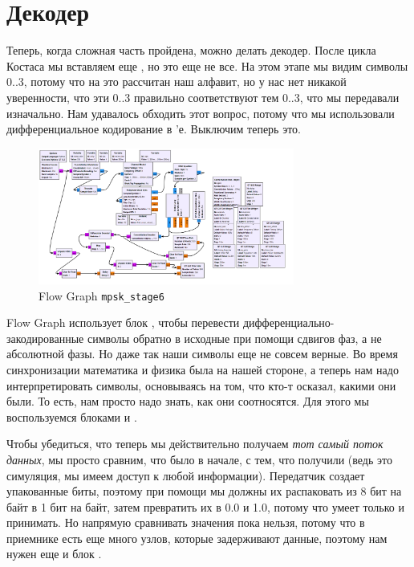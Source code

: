 \documentclass[a4paper,12pt]{report}
\begin{document}
    \chapter{Декодер}
    
    Теперь, когда сложная часть пройдена, можно делать декодер. После цикла Костаса мы вставляем еще , но это еще не все. На этом этапе мы видим символы 0..3, потому что на это рассчитан наш алфавит, но у нас нет никакой уверенности, что эти 0..3 правильно соответствуют тем 0..3, что мы передавали изначально. Нам удавалось обходить этот вопрос, потому что мы использовали дифференциальное кодирование в 'е. Выключим теперь это.
    
    \begin{figure}[H]
        \centering
        \includegraphics[width=0.75\textwidth]{images/mpsk_stage6_fg.png}
        \caption{Flow Graph \texttt{mpsk\_stage6}}
        \label{fig:mpsk_stage6_fg}
    \end{figure}
    
    Flow Graph использует блок , чтобы перевести дифференциально-закодированные символы обратно в исходные при помощи сдвигов фаз, а не абсолютной фазы. Но даже так наши символы еще не совсем верные. Во время синхронизации математика и физика была на нашей стороне, а теперь нам надо интерпретировать символы, основываясь на том, что кто-т осказал, какими они были. То есть, нам просто надо знать, как они соотносятся. Для этого мы воспользуемся блоками  и .
    
    Чтобы убедиться, что теперь мы действительно получаем \emph{тот самый поток данных}, мы просто сравним, что было в начале, с тем, что получили (ведь это симуляция, мы имеем доступ к любой информации). Передатчик создает упакованные биты, поэтому при помощи  мы должны их распаковать из 8 бит на байт в 1 бит на байт, затем превратить их в  0.0 и 1.0, потому что  умеет только  и  принимать. Но напрямую сравнивать значения пока нельзя, потому что в приемнике есть еще много узлов, которые задерживают данные, поэтому нам нужен еще и блок .
    
\end{document}
